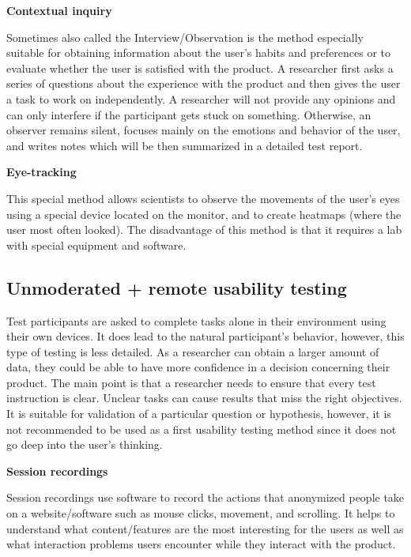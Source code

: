 \documentclass[a4paper,10pt,twoside]{article}
\begin{document}
\smallskip

\noindent \textbf {Contextual inquiry}

\noindent Sometimes also called the Interview/Observation is the method especially suitable for obtaining information about the user's habits and preferences or to evaluate whether the user is satisfied with the product. A researcher first asks a series of questions about the experience with the product and then gives the user a task to work on independently. A researcher will not provide any opinions and can only interfere if the participant gets stuck on something. Otherwise, an observer remains silent, focuses mainly on the emotions and behavior of the user, and writes notes which will be then summarized in a detailed test report.

\smallskip

\noindent \textbf {Eye-tracking}

\noindent This special method allows scientists to observe the movements of the user's eyes using a special device located on the monitor, and to create heatmaps (where the user most often looked). The disadvantage of this method is that it requires a lab with special equipment and software.

\subsection{Unmoderated + remote usability testing}

Test participants are asked to complete tasks alone in their environment using their own devices. It does lead to the natural participant's behavior, however, this type of testing is less detailed. As a researcher can obtain a larger amount of data, they could be able to have more confidence in a decision concerning their product. The main point is that a researcher needs to ensure that every test instruction is clear. Unclear tasks can cause results that miss the right objectives. It is suitable for validation of a particular question or hypothesis, however, it is not recommended to be used as a first usability testing method since it does not go deep into the user’s thinking.

\smallskip

\noindent \textbf {Session recordings}

\noindent Session recordings use software to record the actions that anonymized people take on a website/software such as mouse clicks, movement, and scrolling. It helps to understand what content/features are the most interesting for the users as well as what interaction problems users encounter while they interact with the product.
\smallskip
\end{document}
